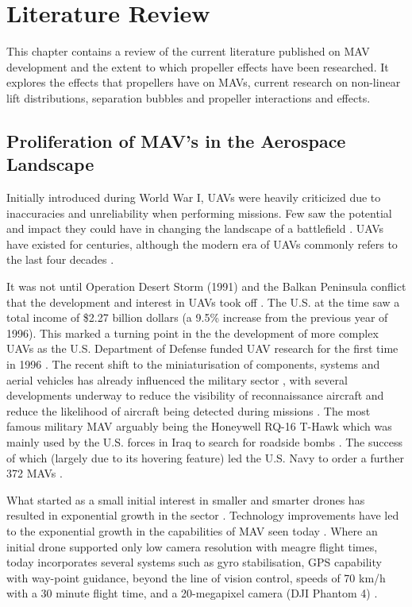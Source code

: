 \graphicspath{{./Figs/}}


\chapter{Literature Review}
This chapter contains a review of the current literature published on MAV development and the extent to which propeller effects have been researched. It explores the effects that propellers have on MAVs, current research on non-linear lift distributions, separation bubbles and propeller interactions and effects.

\section{Proliferation of MAV's in the Aerospace Landscape}
\label{subsec:ProliferationMAVs}
Initially introduced during World War I, UAVs were heavily criticized due to inaccuracies and unreliability when performing missions. Few saw the potential and impact they could have in changing the landscape of a battlefield \cite{thebook}. UAVs have existed for centuries, although the modern era of UAVs commonly refers to the last four decades \cite{Cook2007}. 

It was not until Operation Desert Storm (1991) and the Balkan Peninsula conflict that the development and interest in UAVs took off \cite{thebook, MacConnell2007}.  The U.S. at the time saw a total income of \$2.27 billion dollars \cite{thebook} (a 9.5\% increase from the previous year of 1996). This marked a turning point in the the development of more complex UAVs \cite{tac2022} as the U.S. Department of Defense funded UAV research for the first time in 1996 \cite{keennon2003}. The recent shift to the miniaturisation of components, systems and aerial vehicles has already influenced the military sector \cite{Aleksander2018, Mil2022}, with several developments underway to reduce the visibility of reconnaissance aircraft and reduce the likelihood of aircraft being detected during missions \cite{Greenwood2019, Saytov2022}.  The most famous military MAV arguably being the Honeywell RQ-16 T-Hawk \cite{Agbeyangi2016}  which was mainly used by the U.S. forces in Iraq to search for roadside bombs \cite{Crivoi2022}. The success of which (largely due to its hovering feature) led the U.S. Navy to order a further 372 MAVs \cite{design2022}.

What started as a small initial interest in smaller and smarter drones has resulted in exponential growth in the sector \cite{NONAMI2007, Wang2019}. Technology improvements have led to the exponential growth in the capabilities of MAV seen today \cite{Yin2020, Jackson2016}. Where an initial drone supported only low camera resolution with meagre flight times, today incorporates several systems such as gyro stabilisation, GPS capability with way-point guidance, beyond the line of vision control, speeds of 70 km/h with a 30 minute flight time, and a 20-megapixel camera (DJI Phantom 4) \cite{Peppa2019}. 




